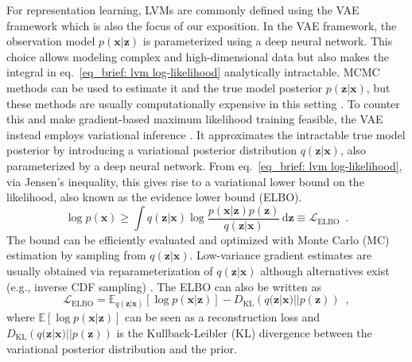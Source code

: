 {For representation learning, LVMs are commonly defined using the VAE framework \cite{kingma_autoencoding_2014, rezende_stochastic_2014} which is also the focus of our exposition. 
In the VAE framework, the observation model $p(\mathbf{x}|\mathbf{z})$ is parameterized using a deep neural network. This choice allows modeling complex and high-dimensional data but also makes the integral in eq.~\ref{eq_brief: lvm log-likelihood} analytically intractable. MCMC methods can be used to estimate it and the true model posterior $p(\mathbf{z}|\mathbf{x})$, but these methods are usually computationally expensive in this setting \cite{mohamed_monte_2019}. 
To counter this and make gradient-based maximum likelihood training feasible, the VAE instead employs variational inference \cite{jordan_introduction_1999}. It approximates the intractable true model posterior by introducing a variational posterior distribution $q(\mathbf{z}|\mathbf{x})$, also parameterized by a deep neural network. From eq.~\ref{eq_brief: lvm log-likelihood}, via Jensen's inequality, this gives rise to a variational lower bound on the likelihood, also known as the evidence lower bound (ELBO).
\begin{equation}
    \log p(\mathbf{x}) \geq \int q(\mathbf{z}|\mathbf{x}) \log \frac{p(\mathbf{x}| \mathbf{z})p(\mathbf{z})}{q(\mathbf{z}|\mathbf{x})} \,\text{d}\mathbf{z} \equiv \mathcal{L}_{\text{ELBO}} \enspace . \label{eq_brief: lvm likelihood bound (elbo)}
\end{equation}
The bound can be efficiently evaluated and optimized with Monte Carlo (MC) estimation by sampling from $q(\mathbf{z}|\mathbf{x})$. Low-variance gradient estimates are usually obtained via reparameterization of $q(\mathbf{z}|\mathbf{x})$ \cite{kingma_autoencoding_2014} although alternatives exist (e.g., inverse CDF sampling) \cite{mohamed_monte_2019}. 
The ELBO can also be written as
\begin{equation}
    \mathcal{L}_{\text{ELBO}} = \mathbb{E}_{q(\mathbf{z}|\mathbf{x})}\left[ \log p(\mathbf{x}|\mathbf{z}) \right] - D_\text{KL}\left( q(\mathbf{z}|\mathbf{x}) || p(\mathbf{z}) \right) \enspace  \label{eq_brief: lvm likelihood bound recon/kl form (elbo)},
\end{equation}
where $\mathbb{E}\left[ \log p(\mathbf{x}|\mathbf{z}) \right]$ can be seen as a reconstruction loss and $D_\text{KL}\left( q(\mathbf{z}|\mathbf{x})||p(\mathbf{z}) \right)$ is the Kullback-Leibler (KL) divergence between the variational posterior distribution and the prior.

}
